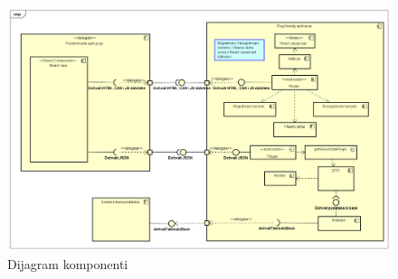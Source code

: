 			\begin{figure}[H]
			\includegraphics[scale=0.4]{slike/DijagramKomponenti.png}
			\centering
			\caption{Dijagram komponenti}
			\label{fig:promjene}
				\end{figure}
    
            
			
			
			
			
		
			
			
			
			
			
		
			
			
			
		
		
